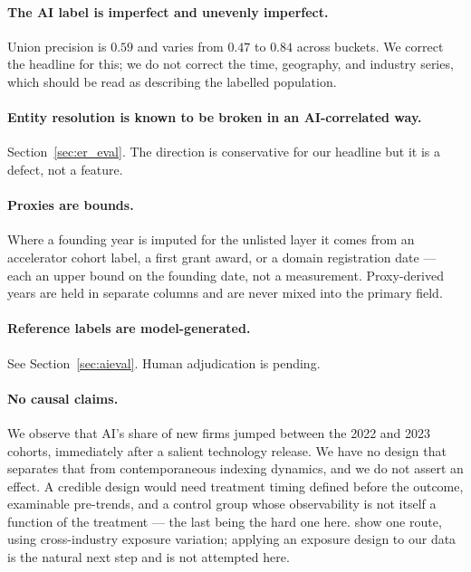 \documentclass[11pt]{article}
\begin{document}
\paragraph{The AI label is imperfect and unevenly imperfect.} Union precision
is $0.59$ and varies from $0.47$ to $0.84$ across buckets. We correct the
headline for this; we do not correct the time, geography, and industry series,
which should be read as describing the labelled population.

\paragraph{Entity resolution is known to be broken in an AI-correlated way.}
Section~\ref{sec:er_eval}. The direction is conservative for our headline but
it is a defect, not a feature.

\paragraph{Proxies are bounds.} Where a founding year is imputed for the
unlisted layer it comes from an accelerator cohort label, a first grant award,
or a domain registration date --- each an upper bound on the founding date, not
a measurement. Proxy-derived years are held in separate columns and are never
mixed into the primary field.

\paragraph{Reference labels are model-generated.} See
Section~\ref{sec:aieval}. Human adjudication is pending.

\paragraph{No causal claims.} We observe that AI's share of new firms jumped
between the 2022 and 2023 cohorts, immediately after a salient technology
release. We have no design that separates that from contemporaneous indexing
dynamics, and we do not assert an effect. A credible design would need
treatment timing defined before the outcome, examinable pre-trends, and a
control group whose observability is not itself a function of the treatment ---
the last being the hard one here. \citet{bena2025prompted} show one route,
using cross-industry exposure variation; applying an exposure design to our
data is the natural next step and is not attempted here.

\end{document}
